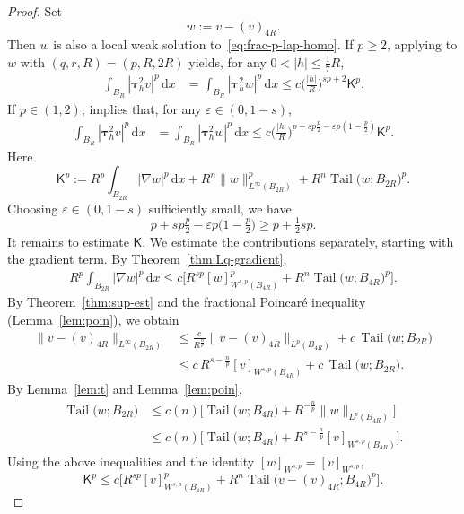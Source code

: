 \documentclass[10pt,letterpaper]{amsart}
\theoremstyle{definition}
\numberwithin{theorem}{section}
\numberwithin{equation}{section}
\newcommand{\1}{\ensuremath{\mathds{1}}}
\newcommand{\dx}{\mathrm{d}x}
\newcommand\sfK{{\boldsymbol{\mathsf K}}}
\renewcommand{\epsilon}{\varepsilon}
\renewcommand{\epsilon}{\varepsilon}
\DeclareMathOperator{\Tail}{Tail}
\numberwithin{equation}{section}
\begin{document}
\begin{proof}
Set
\[
    w:=v-(v)_{4R} .
\]
Then $w$ is also a local weak solution to~\eqref{eq:frac-p-lap-homo}.
If $p\ge2$, applying \cite[Lemma~5.7]{BDLMS-1} to $w$ with
$(q,r,R)=(p,R,2R)$ yields, for any $0<|h|\le \tfrac17 R$,
\begin{align*}
    \int_{B_{R}} |\boldsymbol{\tau}_h^2 v|^p \,\dx
    &=
    \int_{B_{R}} |\boldsymbol{\tau}_h^2 w|^p \,\dx
    \le
    c \Big(\frac{|h|}{R}\Big)^{sp+2}\sfK^p .
\end{align*}
If $p\in(1,2)$, \cite[Lemma~5.1]{BDLMS-2} implies that, for any
$\epsilon\in(0,1-s)$,
\begin{align*}
    \int_{B_{R}} |\boldsymbol{\tau}_h^2 v|^p \,\dx
    &=
    \int_{B_{R}} |\boldsymbol{\tau}_h^2 w|^p \,\dx
    \le
    c \Big(\frac{|h|}{R}\Big)^{p+sp \frac{p}{2}-\epsilon p(1-\frac{p}{2})}\sfK^p .
\end{align*}
Here
\[
    \sfK^p
    :=
    R^p \int_{B_{2R}} |\nabla w|^p \,\dx
    +
    R^n \|w\|_{L^\infty(B_{2R})}^p
    +
    R^n \Tail\big(w;B_{2R}\big)^p .
\]
Choosing $\epsilon\in(0,1-s)$ sufficiently small, we have
\[
    p+ sp\tfrac{p}{2}-\epsilon p\Big(1-\tfrac{p}{2}\Big)
    \ge
    p+\tfrac12 sp .
\]
It remains to estimate $\sfK$.
We estimate the contributions separately, starting with the gradient term.
By Theorem~\ref{thm:Lq-gradient},
\begin{align*}
    R^p \int_{B_{2R}} |\nabla w|^p \,\dx
    \le
    c\Big[
        R^{sp}[w]_{W^{s,p}(B_{4R})}^p
        +
        R^{n}\Tail\big(w;B_{4R}\big)^p
    \Big].
\end{align*}
By Theorem~\ref{thm:sup-est} and the fractional Poincar\'e inequality
(Lemma~\ref{lem:poin}), we obtain
\begin{align*}
    \|v-(v)_{4R}\|_{L^\infty(B_{2 R})}
    &\le
    \frac{c}{R^{\frac{n}{p}}} \|v-(v)_{4R}\|_{L^p(B_{4R})}
    + c\,\Tail\big(w;B_{2R}\big)\\
    &\le
    c\, R^{s-\frac{n}{p}} [v]_{W^{s,p}(B_{4R})}
    + c\,\Tail\big(w;B_{2 R}\big).
\end{align*}
By Lemma~\ref{lem:t} and Lemma~\ref{lem:poin},
\begin{align*}
    \Tail\big(w; B_{2R}\big)
    &\le 
    c(n)\Big[
        \Tail \big(w; B_{4R}\big)
        + R^{-\frac{n}{p}}\| w\|_{L^p(B_{4R})}
    \Big] \\
    &\le 
    c(n)\Big[
        \Tail \big(w; B_{4R}\big)
        + R^{s-\frac{n}{p}} [v]_{W^{s,p}(B_{4R})} 
    \Big].
\end{align*}
Using the above inequalities and the identity $[w]_{W^{s,p}}=[v]_{W^{s,p}}$, 
\[
    \sfK^p
    \le 
    c \Big[
        R^{sp} [v]_{W^{s,p}(B_{4R})}^p
        + R^n \Tail\big(v-(v)_{4R}; B_{4R}\big)^p
    \Big].
\]
\end{proof}
\end{document}

